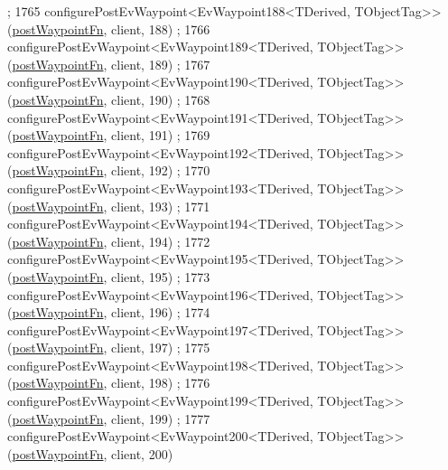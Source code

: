 \begin{DoxyCode}
      ;
1765     configurePostEvWaypoint<EvWaypoint188<TDerived, TObjectTag>>(\hyperlink{classmove__base__z__client_1_1WaypointEventDispatcher_acc538eb7506c13f7cca2268a1742dadd}{postWaypointFn}, client, 188)
      ;
1766     configurePostEvWaypoint<EvWaypoint189<TDerived, TObjectTag>>(\hyperlink{classmove__base__z__client_1_1WaypointEventDispatcher_acc538eb7506c13f7cca2268a1742dadd}{postWaypointFn}, client, 189)
      ;
1767     configurePostEvWaypoint<EvWaypoint190<TDerived, TObjectTag>>(\hyperlink{classmove__base__z__client_1_1WaypointEventDispatcher_acc538eb7506c13f7cca2268a1742dadd}{postWaypointFn}, client, 190)
      ;
1768     configurePostEvWaypoint<EvWaypoint191<TDerived, TObjectTag>>(\hyperlink{classmove__base__z__client_1_1WaypointEventDispatcher_acc538eb7506c13f7cca2268a1742dadd}{postWaypointFn}, client, 191)
      ;
1769     configurePostEvWaypoint<EvWaypoint192<TDerived, TObjectTag>>(\hyperlink{classmove__base__z__client_1_1WaypointEventDispatcher_acc538eb7506c13f7cca2268a1742dadd}{postWaypointFn}, client, 192)
      ;
1770     configurePostEvWaypoint<EvWaypoint193<TDerived, TObjectTag>>(\hyperlink{classmove__base__z__client_1_1WaypointEventDispatcher_acc538eb7506c13f7cca2268a1742dadd}{postWaypointFn}, client, 193)
      ;
1771     configurePostEvWaypoint<EvWaypoint194<TDerived, TObjectTag>>(\hyperlink{classmove__base__z__client_1_1WaypointEventDispatcher_acc538eb7506c13f7cca2268a1742dadd}{postWaypointFn}, client, 194)
      ;
1772     configurePostEvWaypoint<EvWaypoint195<TDerived, TObjectTag>>(\hyperlink{classmove__base__z__client_1_1WaypointEventDispatcher_acc538eb7506c13f7cca2268a1742dadd}{postWaypointFn}, client, 195)
      ;
1773     configurePostEvWaypoint<EvWaypoint196<TDerived, TObjectTag>>(\hyperlink{classmove__base__z__client_1_1WaypointEventDispatcher_acc538eb7506c13f7cca2268a1742dadd}{postWaypointFn}, client, 196)
      ;
1774     configurePostEvWaypoint<EvWaypoint197<TDerived, TObjectTag>>(\hyperlink{classmove__base__z__client_1_1WaypointEventDispatcher_acc538eb7506c13f7cca2268a1742dadd}{postWaypointFn}, client, 197)
      ;
1775     configurePostEvWaypoint<EvWaypoint198<TDerived, TObjectTag>>(\hyperlink{classmove__base__z__client_1_1WaypointEventDispatcher_acc538eb7506c13f7cca2268a1742dadd}{postWaypointFn}, client, 198)
      ;
1776     configurePostEvWaypoint<EvWaypoint199<TDerived, TObjectTag>>(\hyperlink{classmove__base__z__client_1_1WaypointEventDispatcher_acc538eb7506c13f7cca2268a1742dadd}{postWaypointFn}, client, 199)
      ;
1777     configurePostEvWaypoint<EvWaypoint200<TDerived, TObjectTag>>(\hyperlink{classmove__base__z__client_1_1WaypointEventDispatcher_acc538eb7506c13f7cca2268a1742dadd}{postWaypointFn}, client, 200)

\end{DoxyCode}
